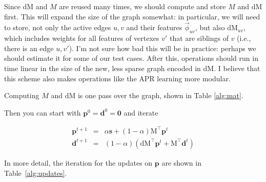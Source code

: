 \documentclass[12pt]{article}
\newcommand{\vek}[1]{\textbf{#1}}
\newcommand{\M}{\textrm{M}}
\newcommand{\dM}{\textrm{dM}}
\newcommand{\vphi}{\vec{\phi}}
\begin{document}
Since $\dM$ and $M$ are reused many times, we should compute and store
$M$ and $\dM$ first.  This will expand the size of the graph somewhat:
in particular, we will need to store, not only the active edges $u,v$
and their features $\vphi_{uv}$, but also $\dM_{uv}$, which includes
weights for all features of vertexes $v'$ that are siblings of $v$
(i.e., there is an edge $u,v'$).  I'm not sure how bad this will be in
practice: perhaps we should estimate it for some of our test cases.
After this, operations should run in time linear in the size of the
new, less sparse graph encoded in $\dM$.  I believe that this scheme
also makes operations like the APR learning more modular.

Computing $M$ and $\dM$ is one pass over the graph, shown in Table
\ref{alg:mat}.


Then you can start with $\vek{p}^0 = \vek{d}^0 = \vek{0}$ and iterate

\begin{eqnarray}
\vek{p}^{t+1}  & =  & \alpha \vek{s} + (1-\alpha) \M^\top \vek{p}^t \\
\vek{d}^{t+1}  & =  & (1-\alpha) \left( \dM^\top \vek{p}^t  + \M^\top \vek{d}^t \right)
\end{eqnarray}

In more detail, the iteration for the updates on $\vek{p}$ are shown
in Table~\ref{alg:updates}.
\end{document}
